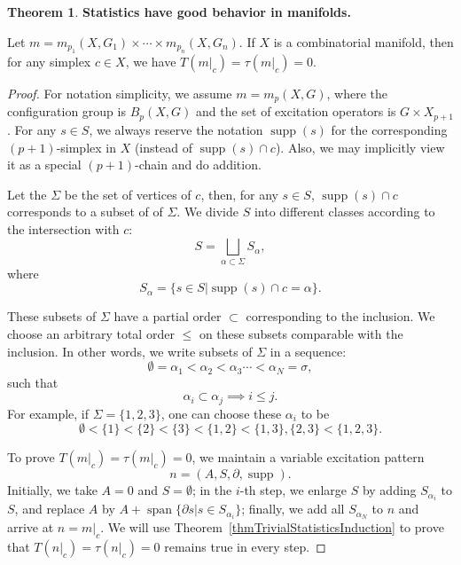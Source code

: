 \documentclass[reprint, amsmath, amssymb, showpacs, floatfix, longbibliography, aps, twocolumn, superscriptaddress, nofootinbib]{revtex4-2}
\newcommand{\supp}{\operatorname{supp}}
\theoremstyle{definition}
\newtheorem{theorem}{Theorem}[section]
\begin{document}
\begin{theorem}\label{thmLocalTopologyCondition}
	\textbf{Statistics have good behavior in manifolds.}
	
	Let $m=m_{p_1}(X,G_1)\times\cdots\times m_{p_n}(X,G_n)$. If $X$ is a combinatorial manifold, then for any simplex $c\in X$, we have $T(m|_c)=\tau(m|_c)=0$.
\end{theorem}
\begin{proof}
	For notation simplicity, we assume $m=m_p(X,G)$, where the configuration group is $B_p(X,G)$ and the set of excitation operators is $G\times X_{p+1}$. For any $s\in S$, we always reserve the notation $\supp(s)$ for the corresponding $(p+1)$-simplex in $X$ (instead of $\supp(s)\cap c$). Also, we may implicitly view it as a special $(p+1)$-chain and do addition.
	
	 Let the $\Sigma$ be the set of vertices of $c$, then, for any $s\in S$, $\supp(s)\cap c$ corresponds to a subset of of $\Sigma$. We divide $S$ into different classes according to the intersection with $c$:
	\begin{equation}
		S=\bigsqcup_{\alpha\subset \Sigma}S_\alpha,
	\end{equation}
	where
	\begin{equation}
		S_\alpha=\{s\in S|\supp(s)\cap c=\alpha\}.
	\end{equation}
	
	These subsets of $\Sigma$ have a partial order $\subset $ corresponding to the inclusion. We choose an arbitrary total order $\le$ on these subsets comparable with the inclusion. In other words, we write subsets of $\Sigma$ in a sequence:
	\begin{equation}
		\emptyset=\alpha_1<\alpha_2<\alpha_3\cdots<\alpha_N=\sigma,
	\end{equation}
	such that
	\begin{equation}
		\alpha_i\subset \alpha_j\implies i\le j.
	\end{equation}
	For example, if $\Sigma=\{1,2,3\}$, one can choose these $\alpha_i$ to be
	\begin{equation}
		\emptyset<\{1\}<\{2\}<\{3\}<\{1,2\}<\{1,3\},\{2,3\}<\{1,2,3\}.
	\end{equation}
	
	
	
	To prove $T(m|_c)=\tau(m|_c)=0$, we maintain a variable excitation pattern
	\begin{equation}
		n=(A,S,\partial,\supp).
	\end{equation}
	Initially, we take $A=0$ and $S=\emptyset$; in the $i$-th step, we enlarge $S$ by adding $S_{\alpha_i}$ to $S$, and replace $A$ by $A+\operatorname{span}\{\partial s|s\in S_{\alpha_i}\}$; finally, we add all $S_{\alpha_N}$ to $n$ and arrive at $n=m|_c$. We will use Theorem~\ref{thmTrivialStatisticsInduction} to prove that $T(n|_c)=\tau(n|_c)=0$ remains true in every step.
	

\end{proof}
\end{document}
